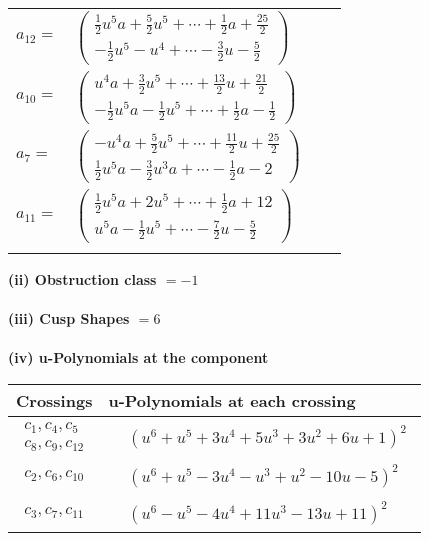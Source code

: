\documentclass[1p]{elsarticle_modified}
\theoremstyle{definition}
\begin{document}
\begin{tabular}{m{7pt} m{180pt} m{7pt} m{180pt} }
\flushright $a_{12}=$&$\begin{pmatrix}\frac{1}{2} u^5 a+\frac{5}{2} u^5+\cdots+\frac{1}{2} a+\frac{25}{2}\\-\frac{1}{2} u^5- u^4+\cdots-\frac{3}{2} u-\frac{5}{2}\end{pmatrix}$ \\
\flushright $a_{10}=$&$\begin{pmatrix}u^4 a+\frac{3}{2} u^5+\cdots+\frac{13}{2} u+\frac{21}{2}\\-\frac{1}{2} u^5 a-\frac{1}{2} u^5+\cdots+\frac{1}{2} a-\frac{1}{2}\end{pmatrix}$ \\
\flushright $a_{7}=$&$\begin{pmatrix}- u^4 a+\frac{5}{2} u^5+\cdots+\frac{11}{2} u+\frac{25}{2}\\\frac{1}{2} u^5 a-\frac{3}{2} u^3 a+\cdots-\frac{1}{2} a-2\end{pmatrix}$ \\
\flushright $a_{11}=$&$\begin{pmatrix}\frac{1}{2} u^5 a+2 u^5+\cdots+\frac{1}{2} a+12\\u^5 a-\frac{1}{2} u^5+\cdots-\frac{7}{2} u-\frac{5}{2}\end{pmatrix}$\\&\end{tabular}
\flushleft \textbf{(ii) Obstruction class $= -1$}\\~\\
\flushleft \textbf{(iii) Cusp Shapes $= 6$}\\~\\
\newpage\renewcommand{\arraystretch}{1}
\flushleft \textbf{(iv) u-Polynomials at the component}\newline \\
\begin{tabular}{m{50pt}|m{274pt}}
Crossings & \hspace{64pt}u-Polynomials at each crossing \\
\hline $$\begin{aligned}c_{1},c_{4},c_{5}\\c_{8},c_{9},c_{12}\end{aligned}$$&$\begin{aligned}
&(u^6+u^5+3 u^4+5 u^3+3 u^2+6 u+1)^2
\end{aligned}$\\
\hline $$\begin{aligned}c_{2},c_{6},c_{10}\end{aligned}$$&$\begin{aligned}
&(u^6+u^5-3 u^4- u^3+u^2-10 u-5)^2
\end{aligned}$\\
\hline $$\begin{aligned}c_{3},c_{7},c_{11}\end{aligned}$$&$\begin{aligned}
&(u^6- u^5-4 u^4+11 u^3-13 u+11)^2
\end{aligned}$\\
\hline
\end{tabular}\\~\\
\end{document}
